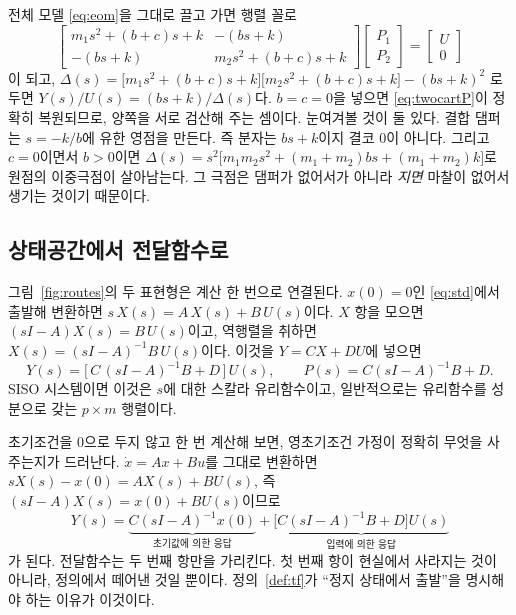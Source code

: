 \documentclass[11pt]{article}
\begin{document}
\begin{remark}[$c$와 $b$를 남긴 채 같은 계산을 하면]\label{rem:fullTF}
전체 모델 \eqref{eq:eom}을 그대로 끌고 가면 행렬 꼴로
\[
   \begin{bmatrix}
     m_1s^{2}+(b+c)s+k & -(bs+k)\\[3pt]
     -(bs+k) & m_2s^{2}+(b+c)s+k
   \end{bmatrix}
   \begin{bmatrix}P_1\\[3pt] P_2\end{bmatrix}
   = \begin{bmatrix}U\\[3pt] 0\end{bmatrix}
\]
이 되고,
$\Delta(s) = \bigl[m_1s^{2}+(b+c)s+k\bigr]\bigl[m_2s^{2}+(b+c)s+k\bigr]-(bs+k)^{2}$
로 두면 $Y(s)/U(s) = (bs+k)/\Delta(s)$다. $b=c=0$을 넣으면 \eqref{eq:twocartP}이
정확히 복원되므로, 양쪽을 서로 검산해 주는 셈이다. 눈여겨볼 것이 둘 있다. 결합
댐퍼는 $s=-k/b$에 유한 영점을 만든다. 즉 분자는 $bs+k$이지 결코 $0$이 아니다.
그리고 $c=0$이면서 $b>0$이면
$\Delta(s)=s^{2}\bigl[m_1m_2s^{2}+(m_1+m_2)bs+(m_1+m_2)k\bigr]$로 원점의 이중극점이
살아남는다. 그 극점은 댐퍼가 없어서가 아니라 \emph{지면} 마찰이 없어서 생기는
것이기 때문이다.
\end{remark}

\subsection{상태공간에서 전달함수로}\label{sec:ss2tf}
그림~\ref{fig:routes}의 두 표현형은 계산 한 번으로 연결된다. $x(0)=0$인
\eqref{eq:std}에서 출발해 변환하면 $s\,X(s) = A\,X(s) + B\,U(s)$이다. $X$ 항을
모으면 $(sI-A)X(s) = B\,U(s)$이고, 역행렬을 취하면
$X(s) = (sI-A)^{-1}B\,U(s)$이다. 이것을 $Y = CX + DU$에 넣으면
\begin{equation}\label{eq:ss2tf}
   \boxed{\;Y(s) = \bigl[\,C\,(sI-A)^{-1}B + D\,\bigr]\,U(s),
   \qquad P(s) = C(sI-A)^{-1}B + D. \;}
\end{equation}
SISO 시스템이면 이것은 $s$에 대한 스칼라 유리함수이고, 일반적으로는 유리함수를
성분으로 갖는 $p\times m$ 행렬이다.

\begin{remark}[$x(0)$을 남겨 두면]
초기조건을 0으로 두지 않고 한 번 계산해 보면, 영초기조건 가정이 정확히 무엇을
사 주는지가 드러난다. $\dot x = Ax+Bu$를 그대로 변환하면
$sX(s)-x(0) = AX(s)+BU(s)$, 즉 $(sI-A)X(s) = x(0) + BU(s)$이므로
\[
   Y(s) = \underbrace{C(sI-A)^{-1}x(0)}_{\text{초기값에 의한 응답}}
        + \underbrace{\bigl[C(sI-A)^{-1}B+D\bigr]U(s)}_{\text{입력에 의한 응답}}
\]
가 된다. 전달함수는 두 번째 항만을 가리킨다. 첫 번째 항이 현실에서 사라지는
것이 아니라, 정의에서 떼어낸 것일 뿐이다. 정의~\ref{def:tf}가 ``정지 상태에서
출발''을 명시해야 하는 이유가 이것이다.
\end{remark}
\end{document}
